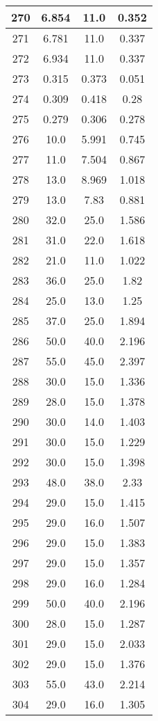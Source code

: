 \begin{table}[H]
\begin{tabular}{|c|c|c|c|}
\hline
270 & 6.854 & 11.0 & 0.352 \\
\hline
271 & 6.781 & 11.0 & 0.337 \\
\hline
272 & 6.934 & 11.0 & 0.337 \\
\hline
273 & 0.315 & 0.373 & 0.051 \\
\hline
274 & 0.309 & 0.418 & 0.28 \\
\hline
275 & 0.279 & 0.306 & 0.278 \\
\hline
276 & 10.0 & 5.991 & 0.745 \\
\hline
277 & 11.0 & 7.504 & 0.867 \\
\hline
278 & 13.0 & 8.969 & 1.018 \\
\hline
279 & 13.0 & 7.83 & 0.881 \\
\hline
280 & 32.0 & 25.0 & 1.586 \\
\hline
281 & 31.0 & 22.0 & 1.618 \\
\hline
282 & 21.0 & 11.0 & 1.022 \\
\hline
283 & 36.0 & 25.0 & 1.82 \\
\hline
284 & 25.0 & 13.0 & 1.25 \\
\hline
285 & 37.0 & 25.0 & 1.894 \\
\hline
286 & 50.0 & 40.0 & 2.196 \\
\hline
287 & 55.0 & 45.0 & 2.397 \\
\hline
288 & 30.0 & 15.0 & 1.336 \\
\hline
289 & 28.0 & 15.0 & 1.378 \\
\hline
290 & 30.0 & 14.0 & 1.403 \\
\hline
291 & 30.0 & 15.0 & 1.229 \\
\hline
292 & 30.0 & 15.0 & 1.398 \\
\hline
293 & 48.0 & 38.0 & 2.33 \\
\hline
294 & 29.0 & 15.0 & 1.415 \\
\hline
295 & 29.0 & 16.0 & 1.507 \\
\hline
296 & 29.0 & 15.0 & 1.383 \\
\hline
297 & 29.0 & 15.0 & 1.357 \\
\hline
298 & 29.0 & 16.0 & 1.284 \\
\hline
299 & 50.0 & 40.0 & 2.196 \\
\hline
300 & 28.0 & 15.0 & 1.287 \\
\hline
301 & 29.0 & 15.0 & 2.033 \\
\hline
302 & 29.0 & 15.0 & 1.376 \\
\hline
303 & 55.0 & 43.0 & 2.214 \\
\hline
304 & 29.0 & 16.0 & 1.305 \\

\end{tabular}
\end{table}
